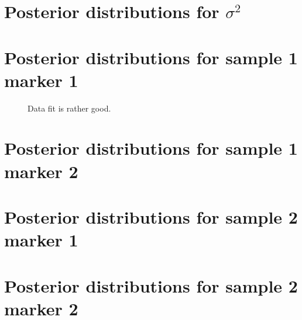 \documentclass[10pt]{article} %
\begin{document}
\newpage
\section{Posterior distributions for $\sigma^2$}
\begin{figure}[H]
  \begin{center}  %
  \end{center}
  \caption{}
  \label{fig:sig2}
\end{figure}

\newpage
\section{Posterior distributions for sample 1 marker 1}
\begin{figure}[H]
  \begin{center}  %
  \end{center}
  \caption{Data fit is rather good.}
  \label{fig:ddi1j1}
\end{figure}

\newpage
\section{Posterior distributions for sample 1 marker 2}
\begin{figure}[H]
  \begin{center}  %
  \end{center}
  \caption{}
  \label{fig:ddi1j2}
\end{figure}

\newpage
\section{Posterior distributions for sample 2 marker 1}
\begin{figure}[H]
  \begin{center}  %
  \end{center}
  \caption{}
  \label{fig:ddi2j1}
\end{figure}

\newpage
\section{Posterior distributions for sample 2 marker 2}
\begin{figure}[H]
  \begin{center}  %
  \end{center}
  \caption{}
  \label{fig:ddi2j2}
\end{figure}
\end{document}
